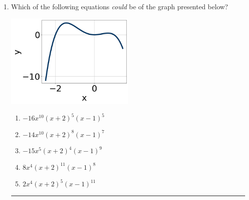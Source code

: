 \documentclass[14pt]{extbook}
\newcommand{\litem}[1]{\item#1\hspace*{-1cm}\rule{\textwidth}{0.4pt}}
\begin{document}
\begin{enumerate}
{\begin{enumerate}[label=\Alph*.]
\end{enumerate} }
\litem{
Which of the following equations \textit{could} be of the graph presented below?
\begin{center}
    \includegraphics[width=0.5\textwidth]{../Figures/polyGraphToFunctionA.png}
\end{center}
\begin{enumerate}[label=\Alph*.]
\item \( -16x^{10} (x + 2)^{5} (x - 1)^{5} \)
\item \( -14x^{10} (x + 2)^{8} (x - 1)^{7} \)
\item \( -15x^{5} (x + 2)^{4} (x - 1)^{9} \)
\item \( 8x^{4} (x + 2)^{11} (x - 1)^{8} \)
\item \( 2x^{4} (x + 2)^{5} (x - 1)^{11} \)


\end{enumerate}}
\end{enumerate}
\end{document}
